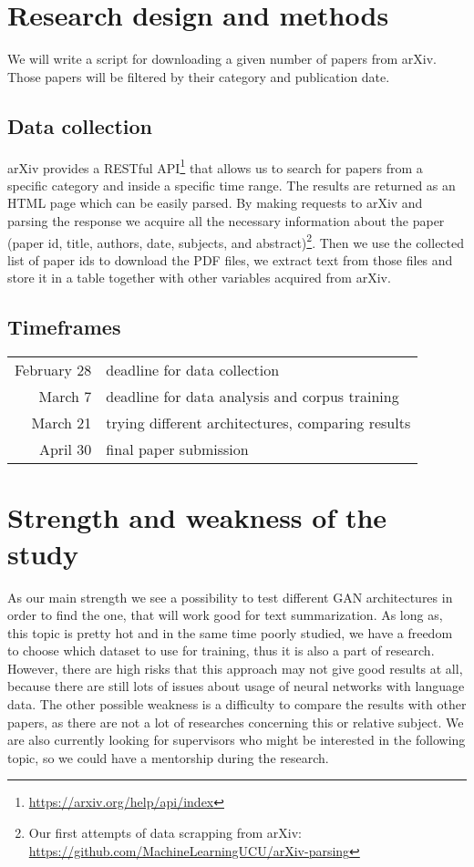 \documentclass[sigplan]{acmart}
\begin{document}
\section{Research design and methods}

We will write a script for downloading a given number of papers from arXiv. Those papers will be filtered by their category and publication date.

\subsection{Data collection}

arXiv provides a RESTful API\footnote{\url{https://arxiv.org/help/api/index}} that allows us to search for papers from a specific category and inside a specific time range. The results are returned as an HTML page which can be easily parsed. By making requests to arXiv and parsing the response we acquire all the necessary information about the paper (paper id, title, authors, date, subjects, and abstract)\footnote{Our first attempts of data scrapping from arXiv:\\ \url{https://github.com/MachineLearningUCU/arXiv-parsing}}. Then we use the collected list of paper ids to download the PDF files, we extract text from those files and store it in a table together with other variables acquired from arXiv.

\subsection{Timeframes}

\begin{center}
\begin{tabular}{ r | l }
 February 28 & deadline for data collection \\ 
 March 7 & deadline for data analysis and corpus training \\  
 March 21 & trying different architectures, comparing results \\
 April 30 & final  paper submission
\end{tabular}
\end{center}

\section{Strength and weakness of the study}
As our main strength we see a possibility to test different GAN architectures in order to find the one, that will work good for text summarization. As long as, this topic is pretty hot and in the same time poorly studied, we have a freedom to choose which dataset to use for training, thus it is also a part of research. 
However, there are high risks that this approach may not give good results at all, because there are still lots of issues about  usage of neural networks with language data. The other possible weakness is a difficulty to compare the results with other papers, as there are not a lot of researches concerning this or relative subject. 
We are also currently looking for supervisors who might be interested in the following topic, so we could have a mentorship during the research.



\end{document}
